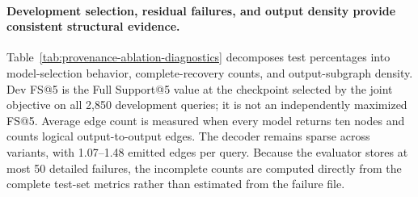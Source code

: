\paragraph{Development selection, residual failures, and output density
provide consistent structural evidence.}
Table~\ref{tab:provenance-ablation-diagnostics} decomposes test
percentages into model-selection behavior, complete-recovery counts, and
output-subgraph density. Dev FS@5 is the Full Support@5 value at the
checkpoint selected by the joint objective on all 2,850 development
queries; it is not an independently maximized FS@5. Average edge count is
measured when every model returns ten nodes and counts logical
output-to-output edges. The decoder remains sparse across variants, with
1.07--1.48 emitted edges per query. Because the evaluator stores
at most 50 detailed failures, the incomplete counts are computed directly
from the complete test-set metrics rather than estimated from the failure
file.

\begin{table}[t]
\centering
\small
\setlength{\tabcolsep}{5pt}
\caption{Interim seed-13 model selection, complete coverage, and
output-density diagnostics for the EPGM R-GCN ablations. Dev FS@5 is a
percentage; the other complete and incomplete columns use 2,851 as their
denominator.}
\label{tab:provenance-ablation-diagnostics}
\end{table}

